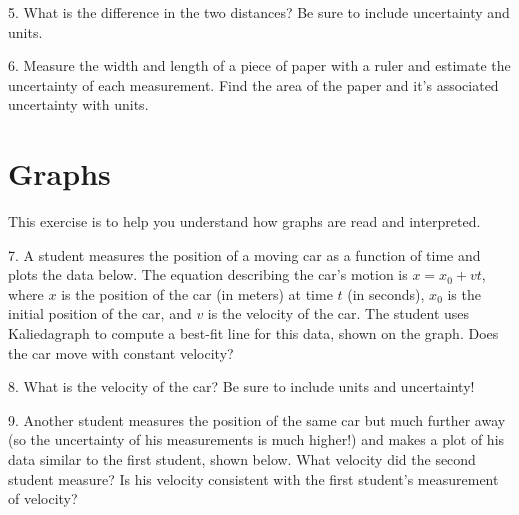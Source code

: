 \documentclass{article}
\begin{document}
\vspace*{1cm}

5. What is the difference in the two distances?  Be sure to include uncertainty and units.

\vspace*{1cm}

6. Measure the width and length of a piece of paper with a ruler and estimate the uncertainty of each measurement. Find the area of the paper and it's associated uncertainty with units.

\vspace*{1cm}

\section*{\normalsize Graphs}
This exercise is to help you understand how graphs are read and interpreted.

\vspace*{0.25cm}

7. A student measures the position of a moving car as a function of time and plots the data below. The equation describing the car's motion is $x = x_0 + v t$, where $x$ is the position of the car (in meters) at time $t$ (in seconds), $x_0$ is the initial position of the car, and $v$ is the velocity of the car. The student uses Kaliedagraph to compute a best-fit line for this data, shown on the graph.  Does the car move with constant velocity?

\vspace*{1cm}

8. What is the velocity of the car? Be sure to include units and uncertainty!

\vspace*{1cm}

9. Another student measures the position of the same car but much further away (so the uncertainty of his measurements is much higher!) and makes a plot of his data similar to the first student, shown below. What velocity did the second student measure? Is his velocity consistent with the first student's measurement of velocity?

\vspace*{1cm}
\end{document}

